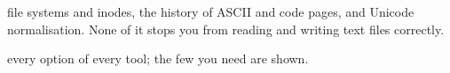 \documentclass[10pt, twoside, openany]{book}
\begin{document}


\frontmatter


\tableofcontents


\mainmatter

  {file systems and inodes, the history of ASCII and code pages, and Unicode normalisation.
   None of it stops you from reading and writing text files correctly.}


  {every option of every tool; the few you need are shown.}


\appendix



\backmatter
\printindex


\end{document}

